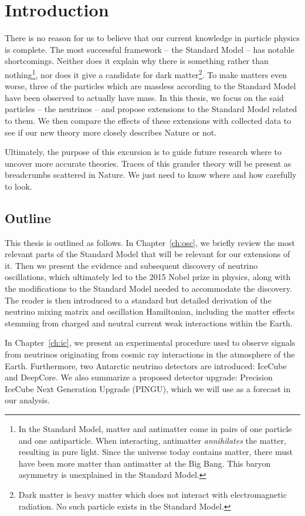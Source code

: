 \chapter{Introduction}
There is no reason for us to believe that our current knowledge in particle physics is complete.
The most successful framework -- the Standard Model -- has notable shortcomings. Neither does it
explain why there is something rather than nothing\footnote{In the Standard Model,
matter and antimatter come in pairs of one particle and one antiparticle. When interacting,
antimatter \emph{annihilates} the matter, resulting in pure light. Since the universe today contains matter,
there must have been more matter than antimatter at the Big Bang. This baryon asymmetry is unexplained in the Standard 
Model.}, nor does it give a candidate for dark matter\footnote{Dark matter is heavy matter which does not interact with electromagnetic radiation.
No such particle exists in the Standard Model.}.
To make matters even worse, three of the particles which are massless according to the Standard Model have been observed to actually have mass.
In this thesis, we focus on the said particles -- the neutrinos -- and propose extensions to the Standard Model related to them. 
We then compare the effects of these extensions with collected data to see if our new theory more closely describes Nature or not. 

Ultimately, the purpose of this excursion is to guide future research where to uncover more accurate theories.
Traces of this grander theory will be present as breadcrumbs scattered in Nature. We just need to know where and how carefully to look. 

\section{Outline}
This thesis is outlined as follows. In Chapter~\ref{ch:osc}, we briefly review the most relevant parts of the Standard Model that will be relevant for our extensions of it.
Then we present the evidence and subsequent discovery of neutrino oscillations, which ultimately led to the 2015 Nobel prize in physics, along with the modifications to the Standard Model needed to accommodate the discovery.
The reader is then introduced to a standard but detailed derivation of the neutrino mixing matrix and oscillation Hamiltonian, including the matter effects stemming from charged and neutral current weak interactions within the Earth.

In Chapter~\ref{ch:ic}, we present an experimental procedure used to observe signals from neutrinos originating from cosmic ray interactions in the atmosphere of the Earth. 
Furthermore, two Antarctic neutrino detectors are introduced: IceCube and DeepCore.
We also summarize a proposed detector upgrade: Precision IceCube Next Generation Upgrade (PINGU), which we will use as a forecast in our analysis.

